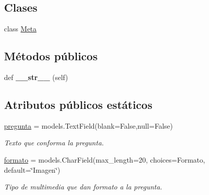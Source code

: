 \subsection*{Clases}
\begin{DoxyCompactItemize}
\item 
class \hyperlink{classappEmotionIOT_1_1models_1_1Pregunta_1_1Meta}{Meta}
\end{DoxyCompactItemize}
\subsection*{Métodos públicos}
\begin{DoxyCompactItemize}
\item 
def {\bfseries \+\_\+\+\_\+str\+\_\+\+\_\+} (self)\hypertarget{classappEmotionIOT_1_1models_1_1Pregunta_a4b408d000307717c0de3c61bd8bce275}{}\label{classappEmotionIOT_1_1models_1_1Pregunta_a4b408d000307717c0de3c61bd8bce275}

\end{DoxyCompactItemize}
\subsection*{Atributos públicos estáticos}
\begin{DoxyCompactItemize}
\item 
\hyperlink{classappEmotionIOT_1_1models_1_1Pregunta_a2a56201ac0b6cc9e019c74c6e95f888d}{pregunta} = models.\+Text\+Field(blank=False,null=False)\hypertarget{classappEmotionIOT_1_1models_1_1Pregunta_a2a56201ac0b6cc9e019c74c6e95f888d}{}\label{classappEmotionIOT_1_1models_1_1Pregunta_a2a56201ac0b6cc9e019c74c6e95f888d}

\begin{DoxyCompactList}\small\item\em Texto que conforma la pregunta. \end{DoxyCompactList}\item 
\hyperlink{classappEmotionIOT_1_1models_1_1Pregunta_adfd5636af5daa453860728da75ef0d8e}{formato} = models.\+Char\+Field(max\+\_\+length=20, choices=Formato, default=\char`\"{}Imagen\char`\"{})\hypertarget{classappEmotionIOT_1_1models_1_1Pregunta_adfd5636af5daa453860728da75ef0d8e}{}\label{classappEmotionIOT_1_1models_1_1Pregunta_adfd5636af5daa453860728da75ef0d8e}

\begin{DoxyCompactList}\small\item\em Tipo de multimedia que dan formato a la pregunta. \end{DoxyCompactList}\end{DoxyCompactItemize}


